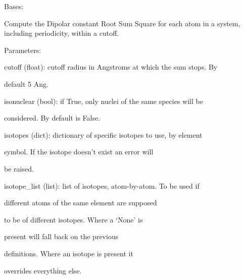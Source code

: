 \documentclass[letterpaper,10pt,english]{sphinxmanual}
\begin{document}

\begin{fulllineitems}
\label{doctree/soprano.properties.nmr.dipolar:soprano.properties.nmr.dipolar.DipolarRSS}
Bases: {\hyperref[doctree/soprano.properties.atomsproperty:soprano.properties.atomsproperty.AtomsProperty]{}}

Compute the Dipolar constant Root Sum Square for each atom in a system,
including periodicity, within a cutoff.

\begin{DUlineblock}{0em}
\item[] Parameters:
\item[]
\begin{DUlineblock}{\DUlineblockindent}
\item[] cutoff (float): cutoff radius in Angstroms at which the sum stops. By
\item[]
\begin{DUlineblock}{\DUlineblockindent}
\item[] default 5 Ang.
\end{DUlineblock}
\item[] isonuclear (bool): if True, only nuclei of the same species will be
\item[]
\begin{DUlineblock}{\DUlineblockindent}
\item[] considered. By default is False.
\end{DUlineblock}
\item[] isotopes (dict): dictionary of specific isotopes to use, by element
\item[]
\begin{DUlineblock}{\DUlineblockindent}
\item[] symbol. If the isotope doesn't exist an error will
\item[] be raised.
\end{DUlineblock}
\item[] isotope\_list (list): list of isotopes, atom-by-atom. To be used if
\item[]
\begin{DUlineblock}{\DUlineblockindent}
\item[] different atoms of the same element are supposed
\item[] to be of different isotopes. Where a `None' is
\item[] present will fall back on the previous
\item[] definitions. Where an isotope is present it
\item[] overrides everything else.
\end{DUlineblock}
\end{DUlineblock}
\end{DUlineblock}


\end{fulllineitems}
\end{document}
